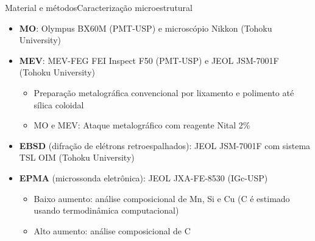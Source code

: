 


\begin{frame}{Material e métodos}{Caracterização microestrutural}
  \begin{itemize}
    \item \textbf{MO}: Olympus BX60M (PMT-USP) e microscópio Nikkon (Tohoku University)
    \item \textbf{MEV}: MEV-FEG FEI Inspect F50 (PMT-USP) e JEOL JSM-7001F (Tohoku University)
    
    \begin{itemize}
      \item Preparação metalográfica convencional por lixamento e polimento até sílica coloidal
      \item MO e MEV: Ataque metalográfico com reagente Nital 2\%
    \end{itemize}

    \item \textbf{EBSD} (difração de elétrons retroespalhados): JEOL JSM-7001F com sistema TSL OIM (Tohoku University)

    \item \textbf{EPMA} (microssonda eletrônica): JEOL JXA-FE-8530 (IGc-USP)
    
    \begin{itemize}
      \item Baixo aumento: análise composicional de Mn, Si e Cu (C é estimado usando termodinâmica computacional)
      \item Alto aumento: análise composicional de C
    \end{itemize}
  \end{itemize}
\end{frame}

